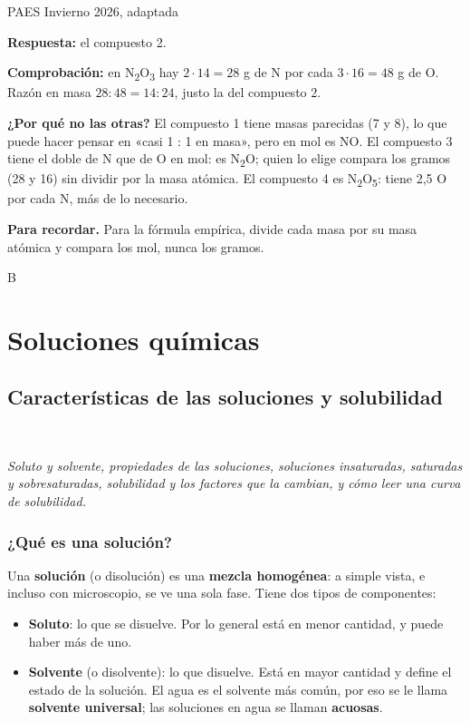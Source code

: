 \begin{elejemplo}{PAES Invierno 2026, adaptada}
{\textbf{Respuesta:} el compuesto 2.

\textbf{Comprobación:} en N\textsubscript{2}O\textsubscript{3} hay $2\cdot 14 = 28$ g de N por cada $3\cdot 16 = 48$ g de O. Razón en masa $28 : 48 = 14 : 24$, justo la del compuesto 2. 

\textbf{¿Por qué no las otras?} El compuesto 1 tiene masas parecidas (7 y 8), lo que puede hacer pensar en «casi 1 : 1 en masa», pero en mol es NO. El compuesto 3 tiene el doble de N que de O en mol: es N\textsubscript{2}O; quien lo elige compara los gramos (28 y 16) sin dividir por la masa atómica. El compuesto 4 es N\textsubscript{2}O\textsubscript{5}: tiene 2,5 O por cada N, más de lo necesario.

\textbf{\color{cienciaD}Para recordar.} Para la fórmula empírica, divide cada masa por su masa atómica y compara los mol, nunca los gramos.}{B}
\end{elejemplo}

\chapter{Soluciones químicas}
\section[Características de las soluciones y solubilidad]{Características de las soluciones y solubilidad}
\modcomun\ \ {\color{gris}\itshape Soluto y solvente, propiedades de las soluciones, soluciones insaturadas, saturadas y sobresaturadas, solubilidad y los factores que la cambian, y cómo leer una curva de solubilidad.\par}
\subsection{¿Qué es una solución?}
Una \textbf{solución} (o disolución) es una \textbf{mezcla homogénea}: a simple vista, e incluso con microscopio, se ve una sola fase. Tiene dos tipos de componentes:

 
\begin{itemize}
  \item \textbf{Soluto}: lo que se disuelve. Por lo general está en menor cantidad, y puede haber más de uno.
  \item \textbf{Solvente} (o disolvente): lo que disuelve. Está en mayor cantidad y define el estado de la solución. El agua es el solvente más común, por eso se le llama \textbf{solvente universal}; las soluciones en agua se llaman \textbf{acuosas}.
\end{itemize}
 

